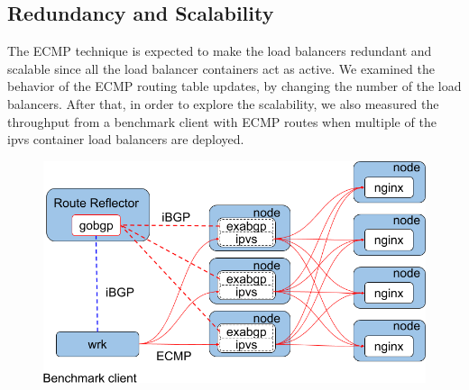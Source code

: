 \subsection{Redundancy and Scalability}

The ECMP technique is expected to make the load balancers redundant and scalable since all the load balancer containers act as active.
We examined the behavior of the ECMP routing table updates, by changing the number of the load balancers.
After that, in order to explore the scalability, we also measured the throughput from a benchmark client with ECMP routes when multiple of the ipvs container load balancers are deployed.

\begin{figure}[b]
    \includegraphics[width=0.9\columnwidth]{Figs/lb_ecmp_schem}
    \caption{}
    \label{fig:lb_ecmp_schem}
\end{figure}

